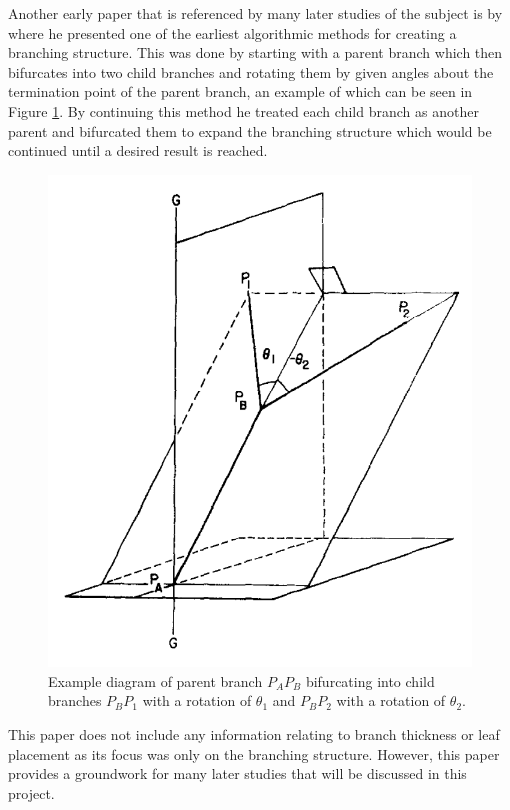 \documentclass[final]{cmpreport}
\begin{document}
Another early paper that is referenced by many later studies of the subject is by
\cite{honda1971description} where he presented one of the earliest algorithmic 
methods for creating a branching structure. This was done by starting with a parent 
branch which then bifurcates into two child branches and rotating them by given 
angles about the termination point of the parent branch, an example of which 
can be seen in Figure \ref{fig:honda-bifurcation}. By continuing this 
method he treated each child branch as another parent and bifurcated them to 
expand the branching structure which would be continued until a desired result is 
reached.

\begin{figure}[ht]
    \includegraphics[scale=0.5]{honda-bifurcation.PNG}
    \centering
    \captionsetup{justification=centering}
    \caption{Example diagram of parent branch $P_AP_B$ bifurcating into child branches
    $P_BP_1$ with a rotation of $\theta_1$ and $P_BP_2$ with a rotation of \textminus$\theta_2$.}
    \label{fig:honda-bifurcation}
\end{figure}

This paper does not include any information relating to branch thickness or leaf 
placement as its focus was only on the branching structure. However, this paper 
provides a groundwork for many later studies that will be discussed in this project.
\end{document}
